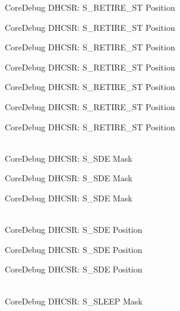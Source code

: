 \begin{DoxyRefList}
\label{deprecated__deprecated000111}%
%
Core\+Debug DHCSR:\+ S\+\_\+\+RETIRE\+\_\+\+ST Position 

\label{deprecated__deprecated000165}%
%
Core\+Debug DHCSR:\+ S\+\_\+\+RETIRE\+\_\+\+ST Position 

\label{deprecated__deprecated000250}%
%
Core\+Debug DHCSR:\+ S\+\_\+\+RETIRE\+\_\+\+ST Position 

\label{deprecated__deprecated000307}%
%
Core\+Debug DHCSR:\+ S\+\_\+\+RETIRE\+\_\+\+ST Position 

\label{deprecated__deprecated000383}%
%
Core\+Debug DHCSR:\+ S\+\_\+\+RETIRE\+\_\+\+ST Position 

\label{deprecated__deprecated000462}%
%
Core\+Debug DHCSR:\+ S\+\_\+\+RETIRE\+\_\+\+ST Position 

\label{deprecated__deprecated000564}%
%
Core\+Debug DHCSR:\+ S\+\_\+\+RETIRE\+\_\+\+ST Position  
\item[{\parbox[t]{\linewidth}{Global \doxylink{group__CMSIS__SCB_ga67f2b2b6729ab2db89f97bbe75224e9d}{Core\+Debug\+\_\+\+DHCSR\+\_\+\+S\+\_\+\+SDE\+\_\+\+Msk} }}]\hfill \\
\label{deprecated__deprecated000020}%
%
Core\+Debug DHCSR:\+ S\+\_\+\+SDE Mask 

\label{deprecated__deprecated000471}%
%
Core\+Debug DHCSR:\+ S\+\_\+\+SDE Mask 

\label{deprecated__deprecated000573}%
%
Core\+Debug DHCSR:\+ S\+\_\+\+SDE Mask  
\item[{\parbox[t]{\linewidth}{Global \doxylink{group__CMSIS__SCB_ga34b00f5a0109d236647be6609d6f04b3}{Core\+Debug\+\_\+\+DHCSR\+\_\+\+S\+\_\+\+SDE\+\_\+\+Pos} }}]\hfill \\
\label{deprecated__deprecated000019}%
%
Core\+Debug DHCSR:\+ S\+\_\+\+SDE Position 

\label{deprecated__deprecated000470}%
%
Core\+Debug DHCSR:\+ S\+\_\+\+SDE Position 

\label{deprecated__deprecated000572}%
%
Core\+Debug DHCSR:\+ S\+\_\+\+SDE Position  
\item[{\parbox[t]{\linewidth}{Global \doxylink{group__CMSIS__CoreDebug_ga98d51538e645c2c1a422279cd85a0a25}{Core\+Debug\+\_\+\+DHCSR\+\_\+\+S\+\_\+\+SLEEP\+\_\+\+Msk} }}]\hfill \\
\label{deprecated__deprecated000024}%
%
Core\+Debug DHCSR:\+ S\+\_\+\+SLEEP Mask 


\end{DoxyRefList}
